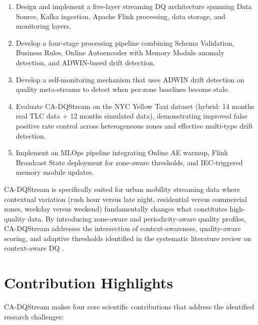 \begin{enumerate}
    \item Design and implement a five-layer streaming DQ architecture spanning Data Source, Kafka ingestion, Apache Flink processing, data storage, and monitoring layers.
    \item Develop a four-stage processing pipeline combining Schema Validation, Business Rules, Online Autoencoder with Memory Module anomaly detection, and ADWIN-based drift detection.
    \item Develop a self-monitoring mechanism that uses ADWIN drift detection on quality meta-streams to detect when per-zone baselines become stale.
    \item Evaluate CA-DQStream on the NYC Yellow Taxi dataset (hybrid: 14 months real TLC data + 12 months simulated data), demonstrating improved false positive rate control across heterogeneous zones and effective multi-type drift detection.
    \item Implement an MLOps pipeline integrating Online AE warmup, Flink Broadcast State deployment for zone-aware thresholds, and IEC-triggered memory module updates.
\end{enumerate}

CA-DQStream is specifically suited for urban mobility streaming data where contextual variation (rush hour versus late night, residential versus commercial zones, weekday versus weekend) fundamentally changes what constitutes high-quality data. By introducing zone-aware and periodicity-aware quality profiles, CA-DQStream addresses the intersection of context-awareness, quality-aware scoring, and adaptive thresholds identified in the systematic literature review on context-aware DQ \cite{contextdq2022}.

\section{Contribution Highlights}
CA-DQStream makes four core scientific contributions that address the identified research challenges:

